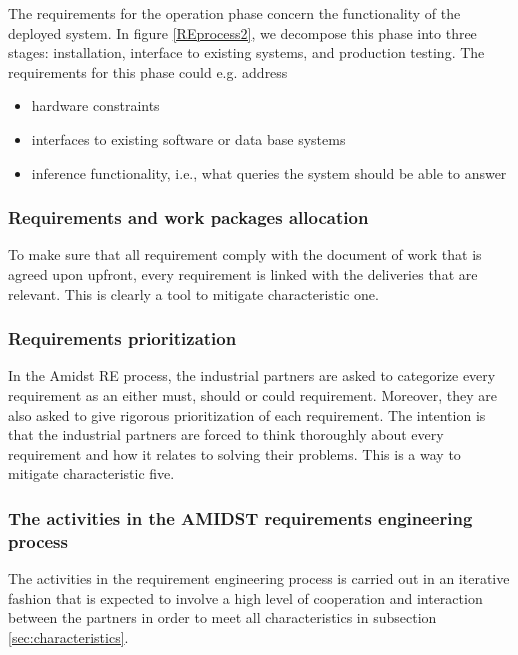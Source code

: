 \documentclass[11pt, oneside]{article}   	%
\begin{document}
The requirements for the operation phase concern the functionality of the deployed system. In figure \ref{REprocess2}, we decompose this phase into three stages: installation, interface to existing systems, and production testing. The requirements for this phase could e.g. address
\begin{itemize}
 \item hardware constraints
 \item interfaces to existing software or data base systems
 \item inference functionality, i.e., what queries the system should be able to answer
\end{itemize}

\subsubsection*{Requirements and work packages allocation}

To make sure that all requirement comply with the document of work that is agreed upon upfront, every requirement is linked with the deliveries that are relevant.  This is clearly a tool to mitigate characteristic one.

\subsubsection*{Requirements prioritization}

In the Amidst RE process, the industrial partners are asked to categorize every requirement as an either must, should or could requirement.  Moreover, they are also asked to give rigorous prioritization of each requirement.  The intention is that the industrial partners are forced to think thoroughly about every requirement and how it relates to solving their problems.  This is a way to mitigate characteristic five.

\subsubsection*{The activities in the AMIDST requirements engineering process}
\label{sec:reprocess}

The activities in the requirement engineering process is carried out in an iterative fashion that is expected to involve a high level of cooperation and interaction between the partners in order to meet all characteristics in subsection \ref{sec:characteristics}. 
\end{document}
